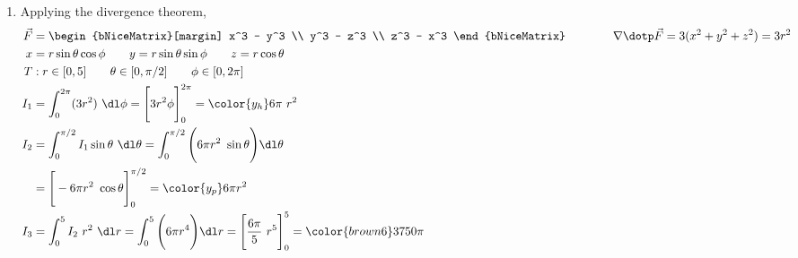 \begin{enumerate}
     \item Applying the divergence theorem,
           \begin{align}
                \vec{F} & = \begin{bNiceMatrix}[margin]
                                 x^3 - y^3 \\ y^3 - z^3 \\ z^3 - x^3
                            \end{bNiceMatrix} \qquad\qquad
                \nabla \dotp \vec{F} = 3(x^2 + y^2 + z^2) = 3r^2                     \\
                x       & = r\sin \theta \cos \phi \qquad y = r\sin \theta \sin \phi
                \qquad z = r\cos \theta                                              \\
                T       & : r \in [0, 5] \qquad \theta \in [0, \pi/2]
                \qquad \phi \in [0, 2\pi]                                            \\
                I_1     & = \int_{0}^{2\pi} (3r^2) \ \dl \phi
                = \Bigg[ 3r^2 \phi \Bigg]_{0}^{2\pi}
                = {\color{y_h} 6\pi\ r^2}                                            \\
                I_2     & = \int_{0}^{\pi/2} I_1 \sin \theta\ \dl \theta
                = \int_{0}^{\pi/2} \Bigg( 6\pi r^2\ \sin \theta \Bigg) \dl \theta    \\
                        & = \Bigg[ -6\pi r^2\ \cos \theta \Bigg]_{0}^{\pi/2}
                = {\color{y_p} 6\pi r^2 }                                            \\
                I_3     & = \int_{0}^{5} I_2\ r^2\ \dl r = \int_{0}^{5}
                \Bigg( 6\pi r^4 \Bigg) \dl r
                = \Bigg[ \frac{6\pi}{5}\ r^5 \Bigg]_{0}^{5}
                = {\color{brown6} 3750 \pi }
           \end{align}


\end{enumerate}
